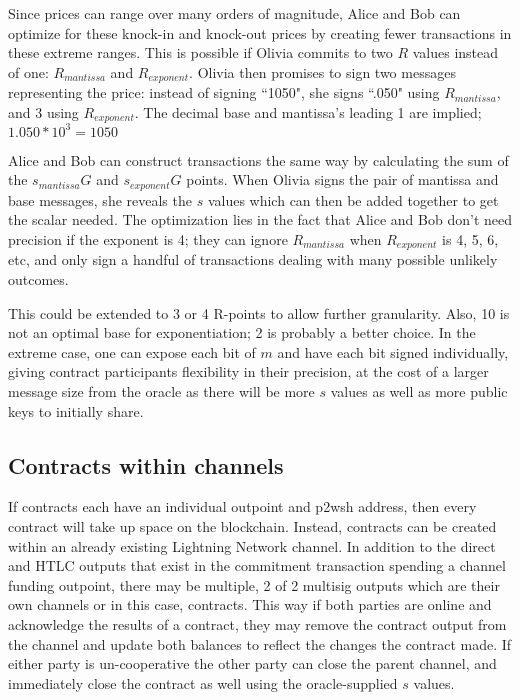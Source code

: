 \documentclass[10pt]{article}
\begin{document}
Since prices can range over many orders of magnitude, Alice and Bob can optimize for these knock-in and knock-out prices by creating fewer transactions in these extreme ranges.  This is possible if Olivia commits to two \(R\) values instead of one: \(R_{mantissa}\) and \(R_{exponent}\).  Olivia then promises to sign two messages representing the price: instead of signing ``1050", she signs ``.050" using  \(R_{mantissa}\), and \(3\) using \(R_{exponent}\).  The decimal base and mantissa's leading 1 are implied; \(1.050 * 10^3 = 1050\)


Alice and Bob can construct transactions the same way by calculating the sum of the \(s_{mantissa}G\) and \(s_{exponent}G\) points.  When Olivia signs the pair of mantissa and base messages, she reveals the \(s\) values which can then be added together to get the scalar needed.
The optimization lies in the fact that Alice and Bob don't need precision if the exponent is 4; they can ignore  \(R_{mantissa}\) when \(R_{exponent}\) is 4, 5, 6, etc, and only sign a handful of transactions dealing with many possible unlikely outcomes.

This could be extended to 3 or 4 R-points to allow further granularity.  Also, 10 is not an optimal base for exponentiation; 2 is probably a better choice.  In the extreme case, one can expose each bit of \(m\) and have each bit signed individually, giving contract participants flexibility in their precision, at the cost of a larger message size from the oracle as there will be more \(s\) values as well as more public keys to initially share.

\subsection*{Contracts within channels}

If contracts each have an individual outpoint and p2wsh address, then every contract will take up space on the blockchain.  Instead, contracts can be created within an already existing Lightning Network channel.  In addition to the direct and HTLC outputs that exist in the commitment transaction spending a channel funding outpoint, there may be multiple, 2 of 2 multisig outputs which are their own channels or in this case, contracts.  This way if both parties are online and acknowledge the results of a contract, they may remove the contract output from the channel and update both balances to reflect the changes the contract made.  If either party is un-cooperative the other party can close the parent channel, and immediately close the contract as well using the oracle-supplied \(s\) values.
\end{document}
